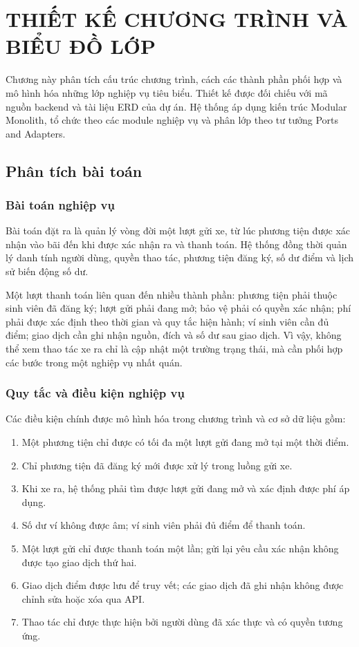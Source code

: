 \chapter{THIẾT KẾ CHƯƠNG TRÌNH VÀ BIỂU ĐỒ LỚP}

Chương này phân tích cấu trúc chương trình, cách các thành phần phối hợp và mô hình hóa những lớp nghiệp vụ tiêu biểu. Thiết kế được đối chiếu với mã nguồn backend và tài liệu ERD của dự án. Hệ thống áp dụng kiến trúc Modular Monolith, tổ chức theo các module nghiệp vụ và phân lớp theo tư tưởng Ports and Adapters.

\section{Phân tích bài toán}

\subsection{Bài toán nghiệp vụ}
Bài toán đặt ra là quản lý vòng đời một lượt gửi xe, từ lúc phương tiện được xác nhận vào bãi đến khi được xác nhận ra và thanh toán. Hệ thống đồng thời quản lý danh tính người dùng, quyền thao tác, phương tiện đăng ký, số dư điểm và lịch sử biến động số dư.

Một lượt thanh toán liên quan đến nhiều thành phần: phương tiện phải thuộc sinh viên đã đăng ký; lượt gửi phải đang mở; bảo vệ phải có quyền xác nhận; phí phải được xác định theo thời gian và quy tắc hiện hành; ví sinh viên cần đủ điểm; giao dịch cần ghi nhận nguồn, đích và số dư sau giao dịch. Vì vậy, không thể xem thao tác xe ra chỉ là cập nhật một trường trạng thái, mà cần phối hợp các bước trong một nghiệp vụ nhất quán.

\subsection{Quy tắc và điều kiện nghiệp vụ}
Các điều kiện chính được mô hình hóa trong chương trình và cơ sở dữ liệu gồm:
\begin{enumerate}[label=\arabic*)]
    \item Một phương tiện chỉ được có tối đa một lượt gửi đang mở tại một thời điểm.
    \item Chỉ phương tiện đã đăng ký mới được xử lý trong luồng gửi xe.
    \item Khi xe ra, hệ thống phải tìm được lượt gửi đang mở và xác định được phí áp dụng.
    \item Số dư ví không được âm; ví sinh viên phải đủ điểm để thanh toán.
    \item Một lượt gửi chỉ được thanh toán một lần; gửi lại yêu cầu xác nhận không được tạo giao dịch thứ hai.
    \item Giao dịch điểm được lưu để truy vết; các giao dịch đã ghi nhận không được chỉnh sửa hoặc xóa qua API.
    \item Thao tác chỉ được thực hiện bởi người dùng đã xác thực và có quyền tương ứng.
\end{enumerate}

